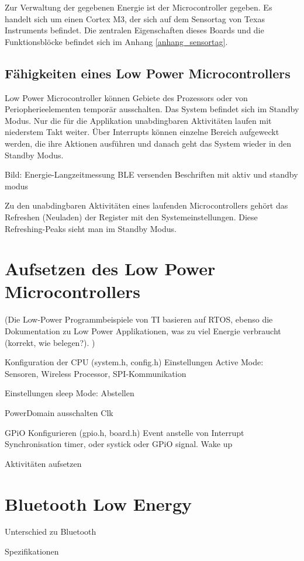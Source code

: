 Zur Verwaltung der gegebenen Energie ist der Microcontroller gegeben. Es handelt sich um einen Cortex M3, der sich auf dem Sensortag von Texas Instruments befindet. Die zentralen Eigenschaften dieses Boards und die Funktionsblöcke befindet sich im Anhang \ref{anhang_sensortag}.

\subsection{Fähigkeiten eines Low Power Microcontrollers}
  
Low Power Microcontroller können Gebiete des Prozessors oder von Periopherieelementen temporär ausschalten. Das System befindet sich im Standby Modus. Nur die für die Applikation unabdingbaren Aktivitäten laufen mit niederstem Takt weiter. Über Interrupts können einzelne Bereich aufgeweckt werden, die ihre Aktionen ausführen und danach geht das System wieder in den Standby Modus.

Bild: Energie-Langzeitmessung BLE versenden
Beschriften mit aktiv und standby modus

Zu den unabdingbaren Aktivitäten eines laufenden Microcontrollers gehört das Refreshen (Neuladen) der Register mit den Systemeinstellungen. Diese Refreshing-Peaks sieht man im Standby Modus.



\section{Aufsetzen des Low Power Microcontrollers}
(Die Low-Power Programmbeispiele von TI basieren auf RTOS, ebenso die Dokumentation zu Low Power Applikationen, was zu viel Energie verbraucht (korrekt, wie belegen?). )

Konfiguration der CPU (system.h, config.h)
Einstellungen Active Mode: Sensoren, Wireless Processor, SPI-Kommunikation

Einstellungen sleep Mode: Abstellen

PowerDomain ausschalten
Clk

GPiO Konfigurieren (gpio.h, board.h)
Event anstelle von Interrupt
Synchronisation
timer, oder systick oder GPiO signal. Wake up

Aktivitäten aufsetzen







\section{Bluetooth Low Energy}

Unterschied zu Bluetooth

Spezifikationen





